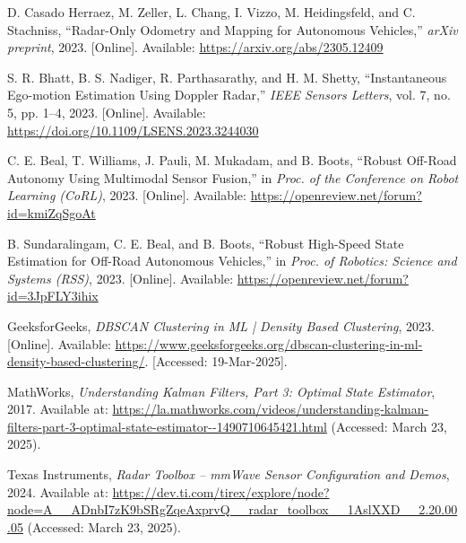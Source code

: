 \begin{thebibliography}{00}
D. Casado Herraez, M. Zeller, L. Chang, I. Vizzo, M. Heidingsfeld, and C. Stachniss, 
``Radar-Only Odometry and Mapping for Autonomous Vehicles,'' 
\textit{arXiv preprint}, 2023. [Online]. Available: \url{https://arxiv.org/abs/2305.12409}

S. R. Bhatt, B. S. Nadiger, R. Parthasarathy, and H. M. Shetty, 
``Instantaneous Ego-motion Estimation Using Doppler Radar,'' 
\textit{IEEE Sensors Letters}, vol. 7, no. 5, pp. 1–4, 2023. [Online]. Available: \url{https://doi.org/10.1109/LSENS.2023.3244030}

C. E. Beal, T. Williams, J. Pauli, M. Mukadam, and B. Boots, 
``Robust Off-Road Autonomy Using Multimodal Sensor Fusion,'' 
in \textit{Proc. of the Conference on Robot Learning (CoRL)}, 2023. [Online]. Available: \url{https://openreview.net/forum?id=kmiZqSgoAt}

B. Sundaralingam, C. E. Beal, and B. Boots, 
``Robust High-Speed State Estimation for Off-Road Autonomous Vehicles,'' 
in \textit{Proc. of Robotics: Science and Systems (RSS)}, 2023. [Online]. Available: \url{https://openreview.net/forum?id=3JpFLY3ihix}


GeeksforGeeks, 
\emph{DBSCAN Clustering in ML | Density Based Clustering}, 
2023. [Online]. Available: \url{https://www.geeksforgeeks.org/dbscan-clustering-in-ml-density-based-clustering/}. [Accessed: 19-Mar-2025].

MathWorks,
\textit{Understanding Kalman Filters, Part 3: Optimal State Estimator},
2017. Available at: \url{https://la.mathworks.com/videos/understanding-kalman-filters-part-3-optimal-state-estimator--1490710645421.html} (Accessed: March 23, 2025).

Texas Instruments, 
\textit{Radar Toolbox – mmWave Sensor Configuration and Demos}, 
2024. Available at: \url{https://dev.ti.com/tirex/explore/node?node=A__ADnbI7zK9bSRgZqeAxprvQ__radar_toolbox__1AslXXD__2.20.00.05} (Accessed: March 23, 2025).




\end{thebibliography}